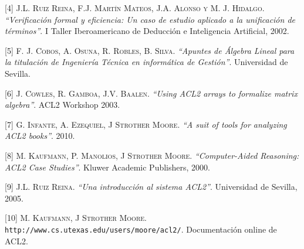 \documentclass[a4paper,10pt]{article}
\begin{document}
\par \vspace{16pt} \noindent

[4] \textsc{J.L. Ruiz Reina, F.J. Martín Mateos, J.A. Alonso y M. J. Hidalgo.} \emph{``Verificación formal y eficiencia: Un caso de estudio aplicado a la unificación de términos''}. I Taller Iberoamericano de Deducción e Inteligencia Artificial, 2002.

\par \vspace{16pt} \noindent

[5] \textsc{F. J. Cobos, A. Osuna, R. Robles, B. Silva.} \emph{``Apuntes de Álgebra Lineal para la titulación de Ingeniería Técnica en informática de Gestión''}. Universidad de Sevilla.

\par \vspace{16pt} \noindent

[6] \textsc{J. Cowles, R. Gamboa, J.V. Baalen.} \emph{``Using ACL2 arrays to formalize matrix algebra''}. ACL2 Workshop 2003.

\par \vspace{16pt} \noindent

[7] \textsc{G. Infante, A. Ezequiel, J Strother Moore.} \emph{``A suit of tools for analyzing ACL2 books''}. 2010.

\par \vspace{16pt} \noindent

[8] \textsc{M. Kaufmann, P. Manolios, J Strother Moore.} \emph{``Computer-Aided Reasoning: ACL2 Case Studies''}. Kluwer Academic Publishers, 2000.

\par \vspace{16pt} \noindent

[9] \textsc{J.L. Ruiz Reina.} \emph{``Una introducción al sistema ACL2''}. Universidad de Sevilla, 2005.

\par \vspace{16pt} \noindent

[10] \textsc{M. Kaufmann, J Strother Moore.} \texttt{http://www.cs.utexas.edu/users/moore/acl2/}. Documentación online de ACL2.
\end{document}
